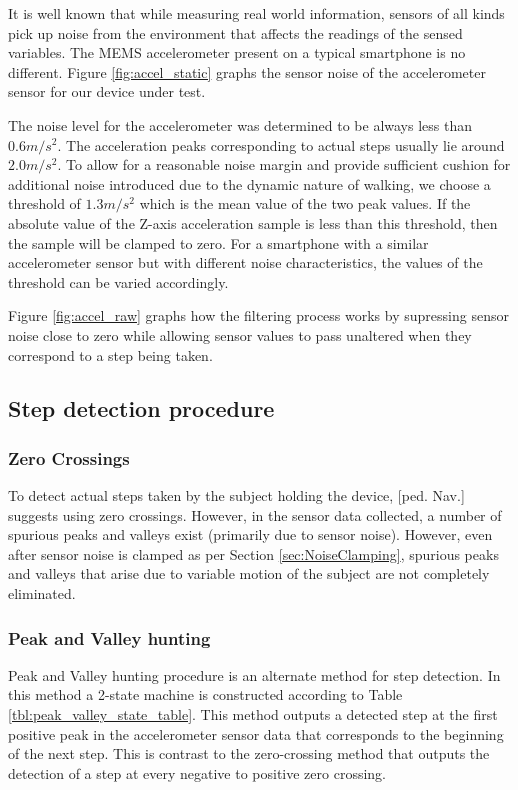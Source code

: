 It is well known that while measuring real world information, sensors of all 
kinds pick up noise from the environment that affects the readings of the 
sensed variables. The MEMS accelerometer present on a typical smartphone is 
no different. Figure \ref{fig:accel_static} graphs the sensor noise of 
the accelerometer sensor for our device under test.

The noise level for the accelerometer was determined to be always less
than $0.6 m/s^2$. The acceleration peaks corresponding to actual steps usually
lie around $2.0 m/s^2$. To allow for a reasonable noise margin and provide
sufficient cushion for additional noise introduced due to the dynamic nature of
walking, we choose a threshold of $1.3 m/s^2$ which is the mean value of the two
peak values. If the absolute value of the Z-axis acceleration sample is less
than this threshold, then the sample will be clamped to zero. For a smartphone
with a similar accelerometer sensor but with different noise characteristics,
the values of the threshold can be varied accordingly. 

Figure \ref{fig:accel_raw} graphs how the filtering process works by
supressing sensor noise close to zero while allowing sensor values to 
pass unaltered when they correspond to a step being taken.

\subsection{Step detection procedure}

\subsubsection{Zero Crossings}

To detect actual steps taken by the subject holding the device, [ped. Nav.] 
suggests using zero crossings. However, in the sensor data collected, a number
of spurious peaks and valleys exist (primarily due to sensor noise). However, 
even after sensor noise is clamped as per Section \ref{sec:NoiseClamping}, 
spurious peaks and valleys that arise due to variable motion of the subject 
are not completely eliminated.

\subsubsection{Peak and Valley hunting}

Peak and Valley hunting procedure is an alternate method for step detection.
In this method a 2-state machine is constructed according to Table
\ref{tbl:peak_valley_state_table}. This method outputs a detected step at 
the first positive peak in the accelerometer sensor data that corresponds to 
the beginning of the next step. This is contrast to the zero-crossing method 
that outputs the detection of a step at every negative to positive zero 
crossing. 


